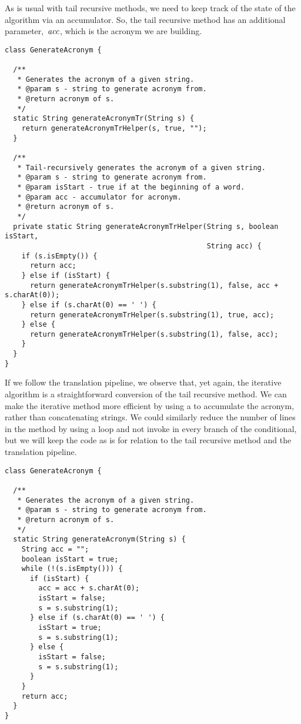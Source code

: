 As is usual with tail recursive methods, we need to keep track of the state of the algorithm via an accumulator.
So, the tail recursive method has an additional parameter,~$\emph{acc}$, which is the acronym we are building.

\begin{lstlisting}[language=MyJava]
class GenerateAcronym {

  /**
   * Generates the acronym of a given string.
   * @param s - string to generate acronym from.
   * @return acronym of s.
   */
  static String generateAcronymTr(String s) {
    return generateAcronymTrHelper(s, true, "");
  }

  /**
   * Tail-recursively generates the acronym of a given string.
   * @param s - string to generate acronym from.
   * @param isStart - true if at the beginning of a word.
   * @param acc - accumulator for acronym.
   * @return acronym of s.
   */
  private static String generateAcronymTrHelper(String s, boolean isStart, 
                                                String acc) {
    if (s.isEmpty()) { 
      return acc; 
    } else if (isStart) { 
      return generateAcronymTrHelper(s.substring(1), false, acc + s.charAt(0)); 
    } else if (s.charAt(0) == ' ') { 
      return generateAcronymTrHelper(s.substring(1), true, acc); 
    } else { 
      return generateAcronymTrHelper(s.substring(1), false, acc); 
    }
  }
}
\end{lstlisting}

If we follow the translation pipeline, we observe that, yet again, the iterative algorithm is a straightforward conversion of the tail recursive method. 
We can make the iterative method more efficient by using a  to accumulate the acronym, rather than concatenating strings.
We could similarly reduce the number of lines in the method by using a  loop and not invoke  in every branch of the conditional, but we will keep the code as is for relation to the tail recursive method and the translation pipeline.

\begin{lstlisting}[language=MyJava]
class GenerateAcronym {

  /**
   * Generates the acronym of a given string.
   * @param s - string to generate acronym from.
   * @return acronym of s.
   */
  static String generateAcronym(String s) {
    String acc = "";
    boolean isStart = true;
    while (!(s.isEmpty())) {
      if (isStart) { 
        acc = acc + s.charAt(0);
        isStart = false; 
        s = s.substring(1);
      } else if (s.charAt(0) == ' ') { 
        isStart = true; 
        s = s.substring(1);
      } else {
        isStart = false;
        s = s.substring(1);
      }
    }
    return acc;
  }
}
\end{lstlisting}

